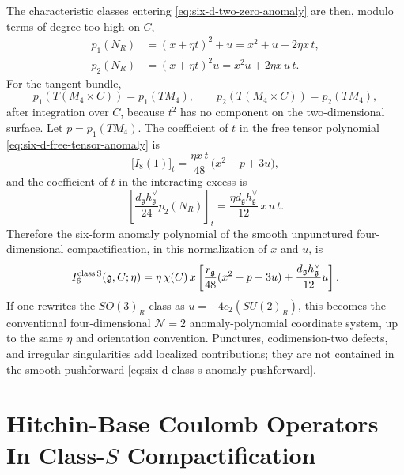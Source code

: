 The characteristic classes entering
\eqref{eq:six-d-two-zero-anomaly} are then, modulo terms of degree too high
on \(C\),
\begin{align}
  p_1(N_R)
  &=
  (x+\eta t)^2+u
   =
  x^2+u+2\eta x\,t, \label{eq:six-d-twisted-p1-nr}\\
  p_2(N_R)
  &=
  (x+\eta t)^2u
   =
  x^2u+2\eta x\,u\,t . \label{eq:six-d-twisted-p2-nr}
\end{align}
For the tangent bundle,
\[
  p_1(T(M_4\times C))=p_1(TM_4),
  \qquad
  p_2(T(M_4\times C))=p_2(TM_4),
\]
after integration over \(C\), because \(t^2\) has no component on the
two-dimensional surface.  Let \(p=p_1(TM_4)\).  The coefficient of \(t\) in
the free tensor polynomial \eqref{eq:six-d-free-tensor-anomaly} is
\begin{equation}
  \bigl[I_8(1)\bigr]_{t}
  =
  \frac{\eta x\,t}{48}\,
  \bigl(x^2-p+3u\bigr),
  \label{eq:six-d-free-tensor-twist-linear-term}
\end{equation}
and the coefficient of \(t\) in the interacting excess is
\begin{equation}
  \left[
    \frac{d_{\mathfrak g}h^\vee_{\mathfrak g}}{24}p_2(N_R)
  \right]_{t}
  =
  \frac{\eta d_{\mathfrak g}h^\vee_{\mathfrak g}}{12}\,
  x\,u\,t .
  \label{eq:six-d-excess-twist-linear-term}
\end{equation}
Therefore the six-form anomaly polynomial of the smooth unpunctured
four-dimensional compactification, in this normalization of \(x\) and \(u\),
is
\begin{equation}
  I_6^{\rm class\,S}(\mathfrak g,C;\eta)
  =
  \eta\,\chi(C)\,x
  \left[
    \frac{r_{\mathfrak g}}{48}(x^2-p+3u)
    +
    \frac{d_{\mathfrak g}h^\vee_{\mathfrak g}}{12}u
  \right].
  \label{eq:six-d-class-s-anomaly-pushforward}
\end{equation}
If one rewrites the \(SO(3)_R\) class as
\(u=-4c_2(SU(2)_R)\), this becomes the conventional
four-dimensional \(\mathcal N=2\) anomaly-polynomial coordinate system, up to
the same \(\eta\) and orientation convention.  Punctures, codimension-two
defects, and irregular singularities add localized contributions; they are
not contained in the smooth pushforward \eqref{eq:six-d-class-s-anomaly-pushforward}.

\section{Hitchin-Base Coulomb Operators In Class-\texorpdfstring{\(S\)}{S} Compactification}
\label{sec:six-d-class-s-hitchin-base}

